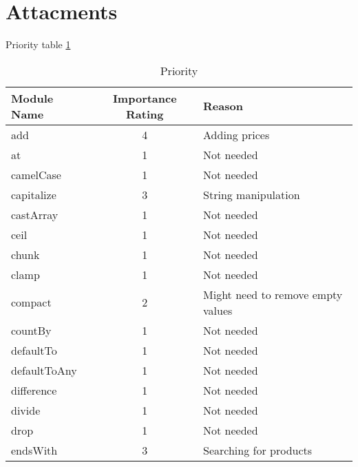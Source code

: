 \documentclass[a4paper, 12pt]{article}
\begin{document}
\section*{Attacments}

Priority table \ref{priorityTable}

	\begin{table}[h]\caption{Priority}\label{priorityTable}
	    \centering
	    \begin{tabular}{l|c|l}
	    \textbf{ Module Name}  & \textbf{Importance Rating} & \textbf{Reason}                                \\ \hline
	    add          & 4                 & Adding prices                         \\  \hline
	    at           & 1                 & Not needed                            \\ \hline
	    camelCase    & 1                 & Not needed                            \\ \hline
	    capitalize   & 3                 & String manipulation                   \\ \hline
	    castArray    & 1                 & Not needed                            \\ \hline
	    ceil         & 1                 & Not needed                            \\ \hline
	    chunk        & 1                 & Not needed                            \\ \hline
	    clamp        & 1                 & Not needed                            \\ \hline
	    compact      & 2                 & Might need to remove empty values     \\ \hline
	    countBy      & 1                 & Not needed                            \\ \hline
	    defaultTo    & 1                 & Not needed                            \\ \hline
	    defaultToAny & 1                 & Not needed                            \\ \hline
	    difference   & 1                 & Not needed                            \\ \hline
	    divide       & 1                 & Not needed                            \\ \hline
	    drop         & 1                 & Not needed                            \\ \hline
	    endsWith     & 3                 & Searching for products                \\ \hline

\end{tabular}
\end{table}
\end{document}
